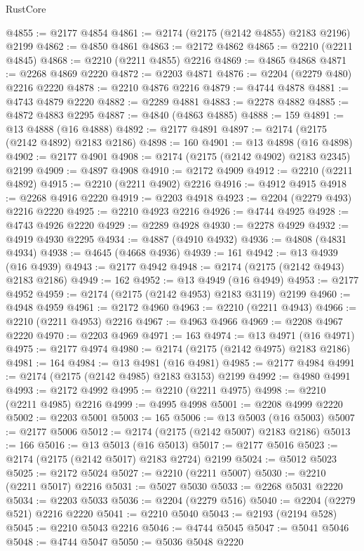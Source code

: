 \begin{lexlean}{RustCore}
\begin{coremodule}
@4855 := @2177 @4854
@4861 := @2174 (@2175 (@2142 @4855) @2183 @2196) @2199
@4862 := @4850 @4861
@4863 := @2172 @4862
@4865 := @2210 (@2211 @4845)
@4868 := @2210 (@2211 @4855) @2216
@4869 := @4865 @4868
@4871 := @2268 @4869 @2220
@4872 := @2203 @4871
@4876 := @2204 (@2279 @480) @2216 @2220
@4878 := @2210 @4876 @2216
@4879 := @4744 @4878
@4881 := @4743 @4879 @2220
@4882 := @2289 @4881
@4883 := @2278 @4882
@4885 := @4872 @4883 @2295
@4887 := @4840 (@4863 @4885)
@4888 := 159
@4891 := @13 @4888 (@16 @4888)
@4892 := @2177 @4891
@4897 := @2174 (@2175 (@2142 @4892) @2183 @2186)
@4898 := 160
@4901 := @13 @4898 (@16 @4898)
@4902 := @2177 @4901
@4908 := @2174 (@2175 (@2142 @4902) @2183 @2345) @2199
@4909 := @4897 @4908
@4910 := @2172 @4909
@4912 := @2210 (@2211 @4892)
@4915 := @2210 (@2211 @4902) @2216
@4916 := @4912 @4915
@4918 := @2268 @4916 @2220
@4919 := @2203 @4918
@4923 := @2204 (@2279 @493) @2216 @2220
@4925 := @2210 @4923 @2216
@4926 := @4744 @4925
@4928 := @4743 @4926 @2220
@4929 := @2289 @4928
@4930 := @2278 @4929
@4932 := @4919 @4930 @2295
@4934 := @4887 (@4910 @4932)
@4936 := @4808 (@4831 @4934)
@4938 := @4645 (@4668 @4936)
@4939 := 161
@4942 := @13 @4939 (@16 @4939)
@4943 := @2177 @4942
@4948 := @2174 (@2175 (@2142 @4943) @2183 @2186)
@4949 := 162
@4952 := @13 @4949 (@16 @4949)
@4953 := @2177 @4952
@4959 := @2174 (@2175 (@2142 @4953) @2183 @3119) @2199
@4960 := @4948 @4959
@4961 := @2172 @4960
@4963 := @2210 (@2211 @4943)
@4966 := @2210 (@2211 @4953) @2216
@4967 := @4963 @4966
@4969 := @2208 @4967 @2220
@4970 := @2203 @4969
@4971 := 163
@4974 := @13 @4971 (@16 @4971)
@4975 := @2177 @4974
@4980 := @2174 (@2175 (@2142 @4975) @2183 @2186)
@4981 := 164
@4984 := @13 @4981 (@16 @4981)
@4985 := @2177 @4984
@4991 := @2174 (@2175 (@2142 @4985) @2183 @3153) @2199
@4992 := @4980 @4991
@4993 := @2172 @4992
@4995 := @2210 (@2211 @4975)
@4998 := @2210 (@2211 @4985) @2216
@4999 := @4995 @4998
@5001 := @2208 @4999 @2220
@5002 := @2203 @5001
@5003 := 165
@5006 := @13 @5003 (@16 @5003)
@5007 := @2177 @5006
@5012 := @2174 (@2175 (@2142 @5007) @2183 @2186)
@5013 := 166
@5016 := @13 @5013 (@16 @5013)
@5017 := @2177 @5016
@5023 := @2174 (@2175 (@2142 @5017) @2183 @2724) @2199
@5024 := @5012 @5023
@5025 := @2172 @5024
@5027 := @2210 (@2211 @5007)
@5030 := @2210 (@2211 @5017) @2216
@5031 := @5027 @5030
@5033 := @2268 @5031 @2220
@5034 := @2203 @5033
@5036 := @2204 (@2279 @516)
@5040 := @2204 (@2279 @521) @2216 @2220
@5041 := @2210 @5040
@5043 := @2193 (@2194 @528)
@5045 := @2210 @5043 @2216
@5046 := @4744 @5045
@5047 := @5041 @5046
@5048 := @4744 @5047
@5050 := @5036 @5048 @2220

\end{coremodule}
\end{lexlean}
